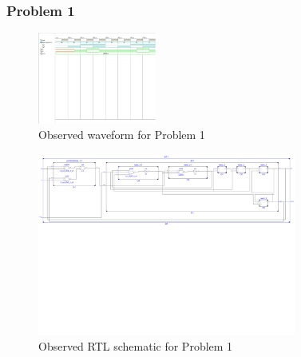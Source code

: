 \documentclass{lab_sheet}
\begin{document}
    \subsubsection*{Problem 1}
    \begin{figure}[H]
        \centering
        \includegraphics[width=.95\linewidth, height=30mm, frame]{../Figures/1.pdf}
        \caption{Observed waveform for Problem 1}
        \label{fig:obs1}
    \end{figure}
    \begin{figure}[H]
        \centering
        \includegraphics[width=\linewidth,  height=60mm]{../Figures/q1_ckt.pdf}
        \caption{Observed RTL schematic for Problem 1}
        \label{fig:rtl1}
    \end{figure}
\end{document}
